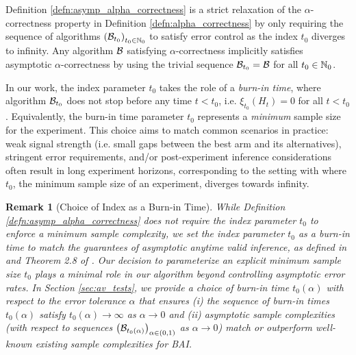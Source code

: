\documentclass{article}
\newtheorem{remark}{Remark}
\begin{document}
Definition \ref{defn:asymp_alpha_correctness} is a strict relaxation of the $\alpha$-correctness property in Definition \ref{defn:alpha_correctness} by only requiring the sequence of algorithms $\left(\mathcal{B}_{t_0}\right)_{t_0 \in \mathbb{N}_0}$ to satisfy error control as the index $t_0$ diverges to infinity. Any algorithm $\mathcal{B}$ satisfying $\alpha$-correctness implicitly satisfies asymptotic $\alpha$-correctness by using the trivial sequence $\mathcal{B}_{t_0} = \mathcal{B}$ for all $t_0 \in \mathbb{N}_0$.
 

In our work, the index parameter $t_0$ takes the role of a \textit{burn-in time}, where algorithm $\mathcal{B}_{t_0}$ does not stop before any time $t < t_0$, i.e. $\xi_{t_0}(H_{t}) = 0$ for all $t < t_0$. Equivalently, the burn-in time parameter $t_0$ represents a \textit{minimum} sample size for the experiment. This choice aims to match common scenarios in practice: weak signal strength (i.e. small gaps between the best arm and its alternatives), stringent error requirements, and/or post-experiment inference considerations often result in long experiment horizons, corresponding to the setting with where $t_0$, the minimum sample size of an experiment, diverges towards infinity.

\begin{remark}[Choice of Index as a Burn-in Time]
    While Definition \ref{defn:asymp_alpha_correctness} does not require the index parameter $t_0$ to enforce a minimum sample complexity, we set the index parameter $t_0$ as a burn-in time to match the guarantees of asymptotic anytime valid inference, as defined in \cite{bibaut2024nearoptimalnonparametricsequentialtests} and Theorem 2.8 of \cite{waudbysmith2024timeuniformcentrallimittheory}. Our decision to parameterize an explicit minimum sample size $t_0$ plays a minimal role in our algorithm beyond controlling asymptotic error rates. In Section \ref{sec:av_tests}, we provide a choice of burn-in time $t_0(\alpha)$ with respect to the error tolerance $\alpha$ that ensures (i) the sequence of burn-in times $t_0(\alpha)$ satisfy $t_0(\alpha) \rightarrow \infty$ as $\alpha \rightarrow 0$ and (ii) asymptotic sample complexities (with respect to sequences $\left(\mathcal{B}_{t_0(\alpha)}\right)_{\alpha \in (0,1)}$ as $\alpha \rightarrow 0$) match or outperform well-known existing sample complexities for BAI.  
\end{remark}
\end{document}
